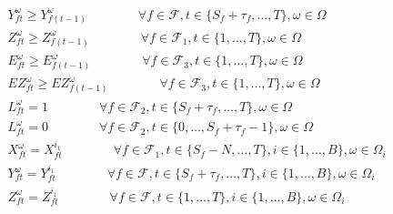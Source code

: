\documentclass[12pt]{article}
\begin{document}
\begin{align}
		& Y_{ft}^\omega \geq Y_{f(t-1)}^\omega \qquad \qquad \forall f \in \mathcal{F}, t \in \{S_f + \tau_f, \dots, T\}, \omega \in \Omega\\
		& Z_{ft}^\omega \geq Z_{f(t-1)}^\omega \qquad \qquad \forall f \in \mathcal{F}_1, t \in \{1, \dots, T\}, \omega \in \Omega\\
		& E_{ft}^\omega \geq E_{f(t-1)}^\omega \qquad \qquad \forall f \in \mathcal{F}_3, t \in \{1, \dots, T\}, \omega \in \Omega\\
		& EZ_{ft}^\omega \geq EZ_{f(t-1)}^\omega \qquad \qquad \forall f \in \mathcal{F}_3, t \in \{1, \dots, T\}, \omega \in \Omega\\
		& L_{ft}^\omega = 1 \qquad \qquad \forall f \in \mathcal{F}_2, t \in \{S_f+\tau_f, \dots, T\}, \omega \in \Omega\\
		& L_{ft}^\omega = 0 \qquad \qquad \forall f \in \mathcal{F}_2, t \in \{0, \dots, S_f+\tau_f-1\}, \omega \in \Omega\\
		& X_{ft}^\omega = X_{ft}^{i_1} \qquad \qquad \forall f \in \mathcal{F}_1, t \in \{S_f - N, \dots, T\}, i \in \{1, \dots, B\}, \omega \in \Omega_i\\
		& Y_{ft}^\omega = Y_{ft}^{i_1} \qquad \qquad \forall f \in \mathcal{F}, t \in \{S_f + \tau_f, \dots, T\}, i \in \{1, \dots, B\}, \omega \in \Omega_i\\
		& Z_{ft}^\omega = Z_{ft}^{i_1} \qquad \qquad \forall f \in \mathcal{F}, t \in \{1, \dots, T\}, i \in \{1, \dots, B\}, \omega \in \Omega_i
	\end{align}
	
\end{document}
